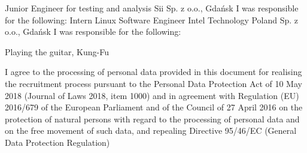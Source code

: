 \documentclass{cvClass} %
\begin{document}
    {
      \experience
        {Junior Engineer for testing and analysis}
        {Sii Sp. z o.o., Gdańsk}
        {I was responsible for the following:}
        {
        }
    }
  \intervalSection
    {}
    {
      \experience
        {Intern Linux Software Engineer}
        {Intel Technology Poland Sp. z o.o., Gdańsk}
        {I was responsible for the following:} {
        }
    }
  
    {Playing the guitar, Kung-Fu}

  \vfill
    {I agree to the processing of personal data provided in this document for realising the recruitment process pursuant to the Personal Data Protection Act of 10 May 2018 (Journal of Laws 2018, item 1000) and in agreement with Regulation (EU) 2016/679 of the European Parliament and of the Council of 27 April 2016 on the protection of natural persons with regard to the processing of personal data and on the free movement of such data, and repealing Directive 95/46/EC (General Data Protection Regulation)}
\end{document}
